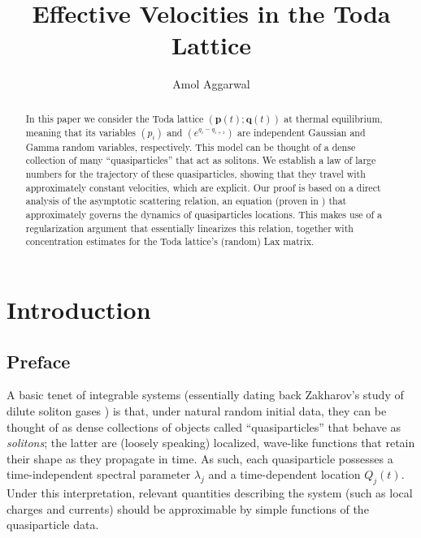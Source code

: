 \documentclass{amsart}
\title{Effective Velocities in the Toda Lattice}
\author{Amol Aggarwal}
\numberwithin{equation}{section}
\theoremstyle{remark}
\theoremstyle{definition}
\begin{document}
	
	\begin{abstract}
		
		
		In this paper we consider the Toda lattice $(\bm{p}(t); \bm{q}(t))$ at thermal equilibrium, meaning that its variables $(p_i)$ and $(e^{q_i-q_{i+1}})$ are independent Gaussian and Gamma random variables, respectively. This model can be thought of a dense collection of many ``quasiparticles'' that act as solitons. We establish a law of large numbers for the trajectory of these quasiparticles, showing that they travel with approximately constant velocities, which are explicit. Our proof is based on a direct analysis of the asymptotic scattering relation, an equation (proven in \cite{LC}) that approximately governs the dynamics of quasiparticles locations. This makes use of a regularization argument that essentially linearizes this relation, together with concentration estimates for the Toda lattice's (random) Lax matrix. 
		
	\end{abstract}

	\maketitle 
	
	\tableofcontents

	\section{Introduction}  
	\label{Chain} 
	
	\subsection{Preface} 
	
	A basic tenet of integrable systems (essentially dating back Zakharov's study of dilute soliton gases \cite{KES}) is that, under natural random initial data, they can be thought of as dense collections of objects called ``quasiparticles'' that behave as \emph{solitons}; the latter are (loosely speaking) localized, wave-like functions that retain their shape as they propagate in time. As such, each quasiparticle possesses a time-independent spectral parameter $\lambda_j$ and a time-dependent location $Q_j (t)$. Under this interpretation, relevant quantities describing the system (such as local charges and currents) should be approximable by simple functions of the quasiparticle data.
	
\end{document}
